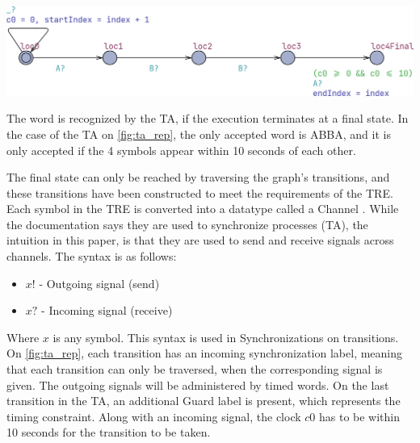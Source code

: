 \vspace{0.75em}
\begin{center}
    \includegraphics[width=\columnwidth]{Documents/Diagrams/CheckingFigures/checking_tarep.png}
    \label{fig:ta_rep}
\end{center}
\vspace{0.75em}

The word is recognized by the TA, if the execution terminates at a final state.
In the case of the TA on \cref{fig:ta_rep}, the only accepted word is ABBA, and it is only accepted if the 4 symbols appear within 10 seconds of each other.

\vspace{.5\baselineskip plus 2pt}
The final state can only be reached by traversing the graph's transitions, and these transitions have been constructed to meet the requirements of the TRE. Each symbol in the TRE is converted into a datatype called a Channel \cite{UPPAAL}. While the documentation says they are used to synchronize processes (TA), the intuition in this paper, is that they are used to send and receive signals across channels. The syntax is as follows:

\vspace{0.5em}
\begin{itemize}
    \setlength\itemsep{0.2em}
    \item $x!$ - Outgoing signal (send)
    \item $x?$ - Incoming signal (receive)
\end{itemize}
\vspace{0.5em}

Where $x$ is any symbol. This syntax is used in Synchronizations on transitions. On \cref{fig:ta_rep}, each transition has an incoming synchronization label, meaning that each transition can only be traversed, when the corresponding signal is given. The outgoing signals will be administered by timed words. On the last transition in the TA, an additional Guard label is present, which represents the timing constraint. Along with an incoming signal, the clock $c0$ has to be within 10 seconds for the transition to be taken.

